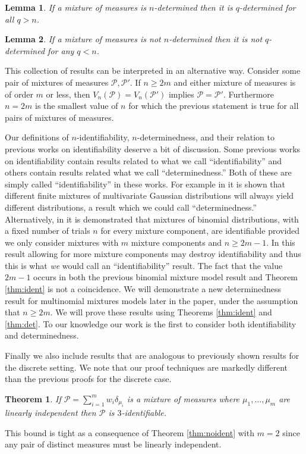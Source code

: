 \documentclass[aos,preprint]{imsart}
\def\sP{\mathscr{P}}
\theoremstyle{plain}
\newtheorem{thm}{Theorem}[section]
\newtheorem{lem}{Lemma}[section]
\theoremstyle{defintion}
\begin{document}
	\begin{lem}\label{lem:det}
		If a mixture of measures is $n$-determined then it is $q$-determined for all $q>n$. 
	\end{lem}
	\begin{lem} \label{lem:nodet}
		If a mixture of measures is not $n$-determined then it is not $q$-determined for any $q<n$. 
	\end{lem}
	This collection of results can be interpreted in an alternative way. Consider some pair of mixtures of measures $\sP, \sP'$. If $n\ge2m$ and either mixture of measures is of order $m$ or less, then $V_n\left( \sP \right) = V_n\left( \sP' \right)$ implies $\sP = \sP'$. Furthermore $n=2m$ is the smallest value of $n$ for which the previous statement is true for all pairs of mixtures of measures.

	Our definitions of $n$-identifiability, $n$-determinedness, and their relation to previous works on identifiability deserve a bit of discussion. Some previous works on identifiability contain results related to what we call ``identifiability'' and others contain results related what we call ``determinedness.'' Both of these are simply called ``identifiability'' in these works. For example in \cite{yakowitz68} it is shown that different finite mixtures of multivariate Gaussian distributions will always yield different distributions, a result which we could call ``determinedness.'' Alternatively, in \cite{teicher63} it is demonstrated that mixtures of binomial distributions, with a fixed number of trials $n$ for every mixture component, are identifiable provided we only consider mixtures with $m$ mixture components and $n \ge 2m-1$. In this result allowing for more mixture components may destroy identifiability and thus this is what {\em we} would call an ``identifiability'' result. The fact that the value $2m-1$ occurs in both the previous binomial mixture model result and Theorem \ref{thm:ident} is not a coincidence. We will demonstrate a new determinedness result for multinomial mixtures models later in the paper, under the assumption that $n\ge 2m$. We will prove these results using Theorems \ref{thm:ident} and \ref{thm:det}. To our knowledge our work is the first to consider both identifiability and determinedness.

	Finally we also include results that are analogous to previously shown results for the discrete setting. We note that our proof techniques are markedly different than the previous proofs for the discrete case.
	\begin{thm} \label{thm:liident}
		If $\sP = \sum_{i=1}^m  w_i\delta_{\mu_i}$ is a mixture of measures where $\mu_1,\ldots,\mu_m$ are linearly independent then $\sP$ is $3$-identifiable.
	\end{thm}
	This bound is tight as a consequence of Theorem \ref{thm:noident} with $m=2$ since any pair of distinct measures must be linearly independent.
\end{document}
